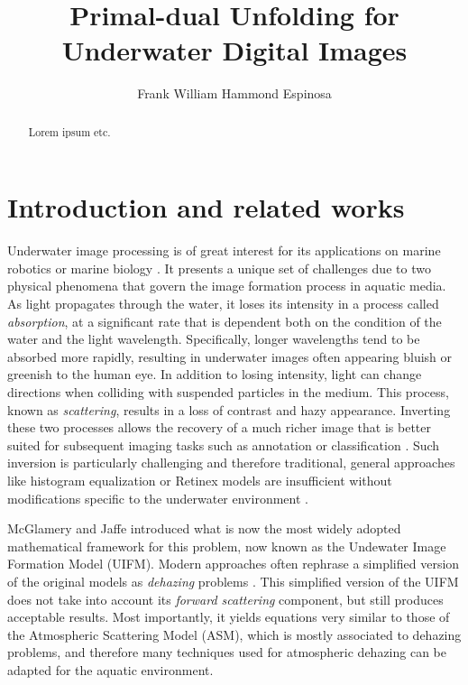 \documentclass[twocolumn,twoside,a4paper,10pt]{IEEEtran}
\title{Primal-dual Unfolding for\\ Underwater Digital Images}
\author{Frank William Hammond Espinosa}
\begin{document}

\maketitle



\begin{abstract}
\noindent Lorem ipsum etc.
\end{abstract}
\section{Introduction and related works}

Underwater image processing is of great interest for its applications on marine robotics \cite{956031} or marine biology \cite{4099139}. It presents a unique set of challenges due to two
physical phenomena that govern the image formation process in aquatic media. As light propagates through the water, it loses its intensity in a process called \textit{absorption}, at a significant rate that is dependent both on the condition of the water and the light
wavelength. Specifically, longer wavelengths tend to be absorbed more rapidly, resulting in underwater images often appearing bluish or greenish to the human eye. In addition to losing intensity, light can change directions when colliding with
suspended particles in the medium. This process, known as \textit{scattering}, results in a loss of contrast and hazy appearance. Inverting these two processes
allows the recovery of a much richer image that is better suited for subsequent imaging tasks such as annotation \cite{lisani2022analysis} or classification \cite{1707999}. Such inversion is particularly challenging and therefore traditional, general approaches like
histogram equalization or Retinex models are insufficient without modifications
specific to the underwater environment \cite{xie2021variational}.

McGlamery \cite{10.1117/12.958279} and Jaffe \cite{50695} introduced what is now the most widely adopted mathematical framework for this problem, now known as the
Undewater Image Formation Model (UIFM). Modern approaches often rephrase a simplified version of the original models as \textit{dehazing} problems \cite{GALDRAN2015132}. This simplified version of the UIFM does not take into account its \textit{forward scattering} component, but still produces acceptable results. Most importantly, it yields equations very similar to those of the Atmospheric Scattering Model (ASM), which is mostly associated to dehazing problems, and therefore many techniques
used for atmospheric dehazing can be adapted for the aquatic environment.
\end{document}
